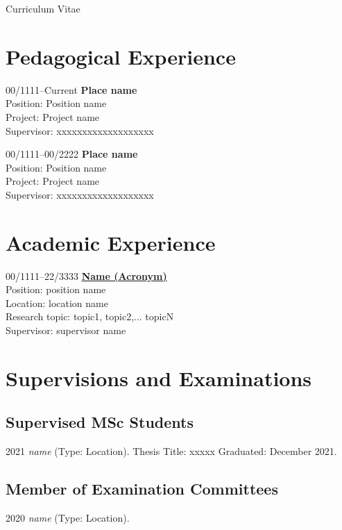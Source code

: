 \documentclass[11pt,a4paper]{article}
\begin{document}
\begin{cv}{Curriculum Vitae}
 \section{Pedagogical Experience}
  \begin{cvlist}{}
      \item[00/1111--Current]
      {\textbf{Place name}}\\
      {Position:} Position name\\
      {Project:} Project name\\
      {Supervisor:} {xxxxxxxxxxxxxxxxxxx}
    \item[00/1111--00/2222]
      {\textbf{Place name}}\\
      {Position:} Position name\\
      {Project:} Project name\\
      {Supervisor:} {xxxxxxxxxxxxxxxxxxx}
\end{cvlist}

\section{Academic Experience}
\begin{cvlist}{}
    \item[00/1111--22/3333]
        \href{about:blank}{\textbf{Name (Acronym)}}\\
        {Position:} {position name} \\
        {Location:} location name\\
        {Research topic:} topic1, topic2,... topicN\\
        {Supervisor:} supervisor name
  \end{cvlist}

\section{Supervisions and Examinations}
\subsection{Supervised MSc Students}
\begin{cvlist}{}
    \item[2021]
    {\em name}
    (Type: Location).
    Thesis Title: xxxxx
    Graduated: December 2021.

\end{cvlist}
\subsection{Member of Examination Committees}
\begin{cvlist}{}
    \item[2020]
    {\em name}
    (Type: Location).


\end{cvlist}
\end{cv}
\end{document}
